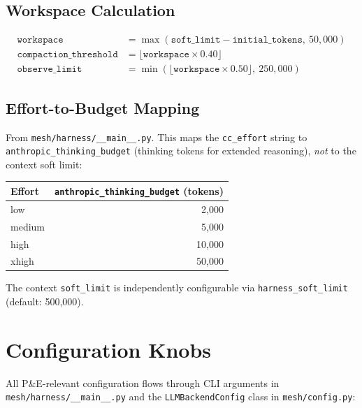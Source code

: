 \documentclass[11pt,letterpaper]{report}
\newcommand{\code}[1]{\texttt{#1}}
\begin{document}
\subsection{Workspace Calculation}

\begin{align*}
\texttt{workspace} &= \max(\texttt{soft\_limit} - \texttt{initial\_tokens},\ 50{,}000) \\
\texttt{compaction\_threshold} &= \lfloor \texttt{workspace} \times 0.40 \rfloor \\
\texttt{observe\_limit} &= \min(\lfloor \texttt{workspace} \times 0.50 \rfloor,\ 250{,}000)
\end{align*}

\subsection{Effort-to-Budget Mapping}

From \code{mesh/harness/\_\_main\_\_.py}. This maps the \code{cc\_effort}
string to \code{anthropic\_thinking\_budget} (thinking tokens for extended
reasoning), \emph{not} to the context soft limit:

\begin{table}[h]
\centering
\begin{tabular}{@{}lr@{}}
\toprule
Effort & \code{anthropic\_thinking\_budget} (tokens) \\
\midrule
low & 2{,}000 \\
medium & 5{,}000 \\
high & 10{,}000 \\
xhigh & 50{,}000 \\
\bottomrule
\end{tabular}
\end{table}

\noindent The context \code{soft\_limit} is independently configurable via
\code{harness\_soft\_limit} (default: 500{,}000).

\section{Configuration Knobs}
\label{sec:config-knobs}

All P\&E-relevant configuration flows through CLI arguments in
\code{mesh/harness/\_\_main\_\_.py} and the \code{LLMBackendConfig}
class in \code{mesh/config.py}:
\end{document}
